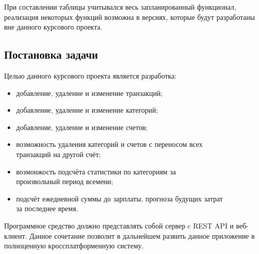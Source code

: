 При составлении таблицы учитывался
весь запланированный функционал, реализация некоторых функций возможна в
версиях, которые будут разработаны вне данного курсового проекта.

\subsection{Постановка задачи}

Целью данного курсового проекта является разработка:
\begin{itemize}
  \item добавление, удаление и изменение транзакций;
  \item добавление, удаление и изменение категорий;
  \item добавление, удаление и изменение счетов;
  \item возможность удаления категорий и счетов с переносом всех \\ транзакций на другой счёт;
  \item возмонжость подсчёта статистики по категориям за \\ произвольный период всемени;
  \item подсчёт ежедневной суммы до зарплаты, прогноза будущих затрат \\ за последнее время.
\end{itemize}

Программное средство должно представлять собой сервер c REST API и веб-клиент.
Данное сочетание позволит в дальнейшем развить данное приложение в полноценную
кроссплатформенную систему.
